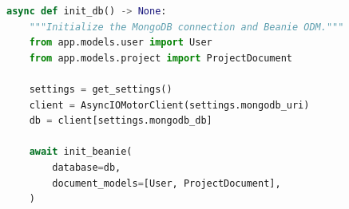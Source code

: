 \begin{center}
\begin{minipage}{\linewidth}
\begin{lstlisting}[language=Python, caption={MongoDB initialisation with Motor and Beanie ODM}, label={lst:db_init}]
async def init_db() -> None:
    """Initialize the MongoDB connection and Beanie ODM."""
    from app.models.user import User
    from app.models.project import ProjectDocument

    settings = get_settings()
    client = AsyncIOMotorClient(settings.mongodb_uri)
    db = client[settings.mongodb_db]

    await init_beanie(
        database=db,
        document_models=[User, ProjectDocument],
    )
\end{lstlisting}
\end{minipage}
\end{center}
